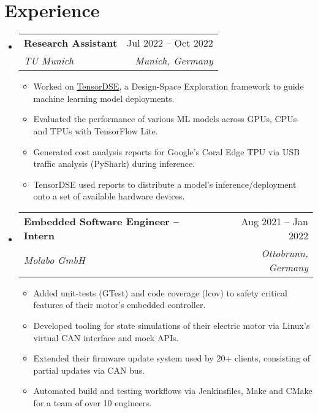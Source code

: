 \documentclass[letterpaper,11pt]{article}
\makeatletter
\newcommand{\resumeItem}[1]{
  \item\small{
    {#1 \vspace{-2pt}}
  }
}
\newcommand{\resumeSubheading}[4]{
  \vspace{-2pt}\item
    \begin{tabular*}{0.97\textwidth}[t]{l@{\extracolsep{\fill}}r}
      \textbf{#1} & #2 \\
      \textit{\small#3} & \textit{\small #4} \\
    \end{tabular*}\vspace{-7pt}
}
\newcommand{\resumeSubHeadingListStart}{\begin{itemize}[leftmargin=0.15in, label={}]}
\newcommand{\resumeSubHeadingListEnd}{\end{itemize}}
\newcommand{\resumeItemListStart}{\begin{itemize}}
\newcommand{\resumeItemListEnd}{\end{itemize}\vspace{-5pt}}
\makeatother
\begin{document}
\vspace{-14.0pt}

\section{Experience}
    \resumeSubHeadingListStart
        \resumeSubheading
            {Research Assistant}{Jul 2022 -- Oct 2022}
            {TU Munich}{Munich, Germany}
            \resumeItemListStart
                \resumeItem{Worked on \href{https://github.com/alxhoff/TensorDSE}{\underline{TensorDSE}}, a Design-Space Exploration framework to guide machine learning model deployments.}
                \resumeItem{Evaluated the performance of various ML models across GPUs, CPUs and TPUs with TensorFlow Lite.}
                \resumeItem{Generated cost analysis reports for Google's Coral Edge TPU via USB traffic analysis (PyShark) during inference.}
                \resumeItem{TensorDSE used reports to distribute a model's inference/deployment onto a set of available hardware devices.}
            \resumeItemListEnd
            \vspace{2.0pt}

        \resumeSubheading
            {Embedded Software Engineer -- Intern}{Aug 2021 -- Jan 2022}
            {Molabo GmbH}{Ottobrunn, Germany}
            \resumeItemListStart
                \resumeItem{Added unit-tests (GTest) and code coverage (lcov) to safety critical features of their motor's embedded controller.}
                \resumeItem{Developed tooling for state simulations of their electric motor via Linux's virtual CAN interface and mock APIs.}
                \resumeItem{Extended their firmware update system used by 20+ clients, consisting of partial updates via CAN bus.}
                \resumeItem{Automated build and testing workflows via Jenkinsfiles, Make and CMake for a team of over 10 engineers.}
            \resumeItemListEnd

    \resumeSubHeadingListEnd 

\vspace{-8.0pt}
\end{document}
